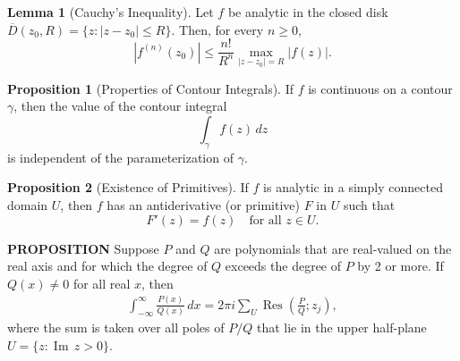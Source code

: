 \documentclass[12pt]{article}
\theoremstyle{definition} %
\newtheorem{proposition}{Proposition}
\newtheorem{lemma}{Lemma}
\theoremstyle{plain} %
\begin{document}
\begin{lemma}[Cauchy's Inequality]
Let \(f\) be analytic in the closed disk \(\overline{D}(z_0,R)=\{z: |z-z_0| \le R\}\). Then, for every \(n \ge 0\),
\[
\left| f^{(n)}(z_0) \right| \le \frac{n!}{R^n} \max_{|z-z_0|=R} |f(z)|.
\]
\end{lemma}

\begin{proposition}[Properties of Contour Integrals]
If \(f\) is continuous on a contour \(\gamma\), then the value of the contour integral
\[
\int_\gamma f(z)\,dz
\]
is independent of the parameterization of \(\gamma\).
\end{proposition}

\begin{proposition}[Existence of Primitives]
If \(f\) is analytic in a simply connected domain \(U\), then \(f\) has an antiderivative (or primitive) \(F\) in \(U\) such that
\[
F'(z) = f(z) \quad \text{for all } z \in U.
\]
\end{proposition}
\textbf{PROPOSITION} \quad Suppose $P$ and $Q$ are polynomials that are real-valued on the real axis and for which the degree of $Q$ exceeds the degree of $P$ by 2 or more. If $Q(x) \neq 0$ for all real $x$, then
\begin{align}
    \int_{-\infty}^{\infty} \frac{P(x)}{Q(x)} \, dx = 2\pi i \sum_U \operatorname{Res}\left(\frac{P}{Q}; z_j\right),
\end{align}
where the sum is taken over all poles of $P/Q$ that lie in the upper half-plane $U = \{z : \operatorname{Im}\, z > 0\}$.
\end{document}
